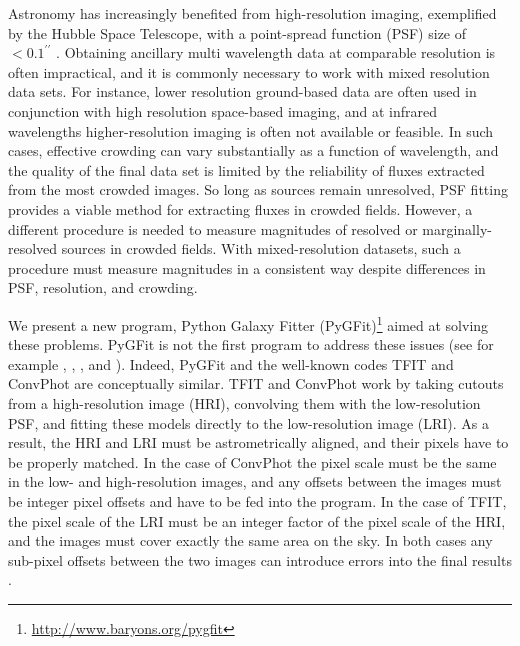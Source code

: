 \documentclass[preprint]{aastex}
\newcommand{\pygfit}{PyGFit}
\newcommand{\tfit}{TFIT}
\newcommand{\convphot}{ConvPhot}
\begin{document}
Astronomy has increasingly benefited from high-resolution imaging, exemplified by the Hubble Space Telescope, with a point-spread function (PSF) size of $<0.1^{\prime\prime}$ \citep{wfc3handbook}.  Obtaining ancillary multi wavelength data at comparable resolution is often impractical, and it is commonly necessary to work with mixed resolution data sets.  For instance, lower resolution ground-based data are often used in conjunction with high resolution space-based imaging, and at infrared wavelengths higher-resolution imaging is often not available or feasible.  In such cases, effective crowding can vary substantially as a function of wavelength, and the quality of the final data set is limited by the reliability of fluxes extracted from the most crowded images.  So long as sources remain unresolved, PSF fitting provides a viable method for extracting fluxes in crowded fields.  However, a different procedure is needed to measure magnitudes of resolved or marginally-resolved sources in crowded fields.  With mixed-resolution datasets, such a procedure must measure magnitudes in a consistent way despite differences in PSF, resolution, and crowding.

We present a new program, Python Galaxy Fitter (\pygfit{}){\footnote{\url{http://www.baryons.org/pygfit}}} aimed at solving these problems.  \pygfit{} is not the first program to address these issues (see for example \citealt{soto99}, \citealt{labbe05}, \citealt{tfit}, and \citealt{desantis07}).  Indeed, \pygfit{} and the well-known codes \tfit{} \citep{tfit} and \convphot{} \citep{desantis07} are conceptually similar.  \tfit{} and \convphot{} work by taking cutouts from a high-resolution image (HRI), convolving them with the low-resolution PSF, and fitting these models directly to the low-resolution image (LRI).  As a result, the HRI and LRI must be astrometrically aligned, and their pixels have to be properly matched.  In the case of \convphot{} the pixel scale must be the same in the low- and high-resolution images, and any offsets between the images must be integer pixel offsets and have to be fed into the program.  In the case of \tfit{}, the pixel scale of the LRI must be an integer factor of the pixel scale of the HRI, and the images must cover exactly the same area on the sky.  In both cases any sub-pixel offsets between the two images can introduce errors into the final results \citep{tfit}.
\end{document}
